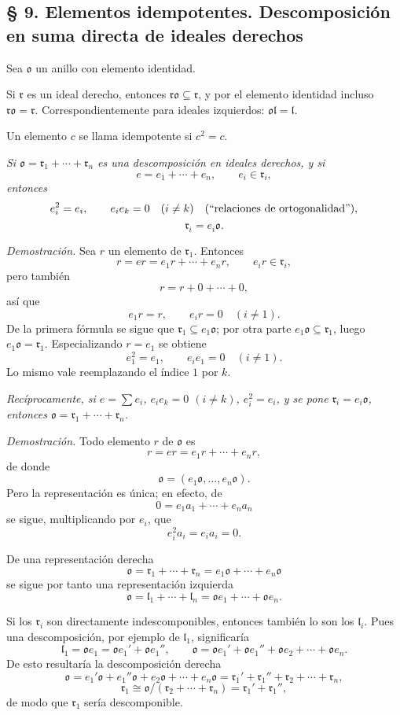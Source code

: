 \documentclass[11pt]{article}
\providecommand{\mo}{\mathfrak{o}}
\providecommand{\ml}{\mathfrak{l}}
\providecommand{\mr}{\mathfrak{r}}
\begin{document}
\subsection*{§ 9. Elementos idempotentes. Descomposición en suma directa de ideales derechos}

Sea $\mo$ un anillo con elemento identidad.

Si $\mr$ es un ideal derecho, entonces $\mr\mo\subseteq\mr$, y por el elemento identidad incluso $\mr\mo=\mr$. Correspondientemente para ideales izquierdos: $\mo\ml=\ml$.

Un elemento $c$ se llama idempotente si $c^2=c$.

\emph{Si $\mo=\mr_1+\cdots+\mr_n$ es una descomposición en ideales derechos, y si}
\[
        e=e_1+\cdots+e_n,
        \qquad e_i\in\mr_i,
\]
\emph{entonces}
\[
        e_i^2=e_i,
        \qquad e_i e_k=0\quad(i\ne k)
        \quad\hbox{(``relaciones de ortogonalidad'')},
\]
\[
        \mr_i=e_i\mo.
\]

\emph{Demostración.} Sea $r$ un elemento de $\mr_1$. Entonces
\[
        r=er=e_1r+\cdots+e_nr,
        \qquad e_ir\in\mr_i,
\]
pero también
\[
        r=r+0+\cdots+0,
\]
así que
\[
        e_1r=r,
        \qquad e_ir=0\quad(i\ne1).
\]
De la primera fórmula se sigue que $\mr_1\subseteq e_1\mo$; por otra parte $e_1\mo\subseteq\mr_1$, luego $e_1\mo=\mr_1$. Especializando $r=e_1$ se obtiene
\[
        e_1^2=e_1,
        \qquad e_i e_1=0\quad(i\ne1).
\]
Lo mismo vale reemplazando el índice $1$ por $k$.

\emph{Recíprocamente, si $e=\sum e_i$, $e_i e_k=0$ $(i\ne k)$, $e_i^2=e_i$, y se pone $\mr_i=e_i\mo$, entonces $\mo=\mr_1+\cdots+\mr_n$.}

\emph{Demostración.} Todo elemento $r$ de $\mo$ es
\[
        r=er=e_1r+\cdots+e_nr,
\]
de donde
\[
        \mo=(e_1\mo,\ldots,e_n\mo).
\]
Pero la representación es única; en efecto, de
\[
        0=e_1a_1+\cdots+e_na_n
\]
se sigue, multiplicando por $e_i$, que
\[
        e_i^2a_i=e_i a_i=0.
\]

De una representación derecha
\[
        \mo=\mr_1+\cdots+\mr_n=e_1\mo+\cdots+e_n\mo
\]
se sigue por tanto una representación izquierda
\[
        \mo=\ml_1+\cdots+\ml_n=\mo e_1+\cdots+\mo e_n.
\]

Si los $\mr_i$ son directamente indescomponibles, entonces también lo son los $\ml_i$. Pues una descomposición, por ejemplo de $\ml_1$, significaría
\[
        \ml_1=\mo e_1=\mo e_1'+\mo e_1'',
        \qquad
        \mo=\mo e_1'+\mo e_1''+\mo e_2+\cdots+\mo e_n.
\]
De esto resultaría la descomposición derecha
\[
        \mo=e_1'\mo+e_1''\mo+e_2\mo+\cdots+e_n\mo
        =\mr_1'+\mr_1''+\mr_2+\cdots+\mr_n,
\]
\[
        \mr_1\cong \mo/(\mr_2+\cdots+\mr_n)=\mr_1'+\mr_1'',
\]
de modo que $\mr_1$ sería descomponible.
\end{document}
